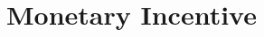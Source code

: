 \documentclass[dvipdfmx, 12pt]{article}
\begin{document}
\newpage

\section{Monetary Incentive}

\begin{landscape}
  \begin{table}
    

  \end{table}

  \begin{table}
    

  \end{table}

  \begin{table}
    

  \end{table}



\end{landscape}
\end{document}

